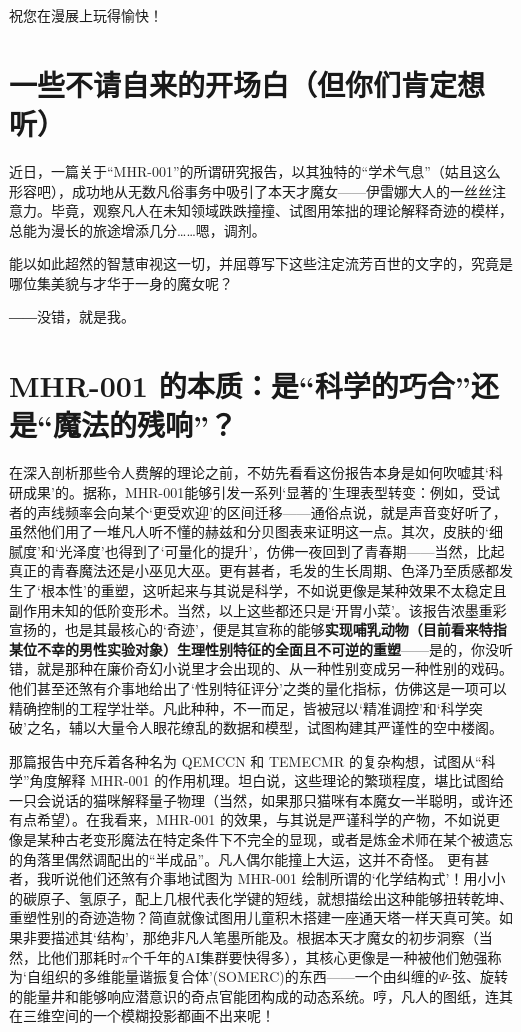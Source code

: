 \documentclass[lang=cn]{elegantpaper}
\begin{document}
祝您在漫展上玩得愉快！

\section*{一些不请自来的开场白（但你们肯定想听）}
近日，一篇关于“MHR-001”的所谓研究报告，以其独特的“学术气息”（姑且这么形容吧），成功地从无数凡俗事务中吸引了本天才魔女——伊雷娜大人的一丝丝注意力。毕竟，观察凡人在未知领域跌跌撞撞、试图用笨拙的理论解释奇迹的模样，总能为漫长的旅途增添几分……嗯，调剂。

能以如此超然的智慧审视这一切，并屈尊写下这些注定流芳百世的文字的，究竟是哪位集美貌与才华于一身的魔女呢？
\begin{flushright}
    ――没错，就是我。
\end{flushright}

\section*{MHR-001 的本质：是“科学的巧合”还是“魔法的残响”？}
在深入剖析那些令人费解的理论之前，不妨先看看这份报告本身是如何吹嘘其‘科研成果’的。据称，MHR-001能够引发一系列‘显著的’生理表型转变：例如，受试者的声线频率会向某个‘更受欢迎’的区间迁移——通俗点说，就是声音变好听了，虽然他们用了一堆凡人听不懂的赫兹和分贝图表来证明这一点。其次，皮肤的‘细腻度’和‘光泽度’也得到了‘可量化的提升’，仿佛一夜回到了青春期——当然，比起真正的青春魔法还是小巫见大巫。更有甚者，毛发的生长周期、色泽乃至质感都发生了‘根本性’的重塑，这听起来与其说是科学，不如说更像是某种效果不太稳定且副作用未知的低阶变形术。当然，以上这些都还只是‘开胃小菜’。该报告浓墨重彩宣扬的，也是其最核心的‘奇迹’，便是其宣称的能够\textbf{实现哺乳动物（目前看来特指某位不幸的男性实验对象）生理性别特征的全面且不可逆的重塑}——是的，你没听错，就是那种在廉价奇幻小说里才会出现的、从一种性别变成另一种性别的戏码。他们甚至还煞有介事地给出了‘性别特征评分’之类的量化指标，仿佛这是一项可以精确控制的工程学壮举。凡此种种，不一而足，皆被冠以‘精准调控’和‘科学突破’之名，辅以大量令人眼花缭乱的数据和模型，试图构建其严谨性的空中楼阁。

那篇报告中充斥着各种名为 QEMCCN 和 TEMECMR 的复杂构想，试图从“科学”角度解释 MHR-001 的作用机理。坦白说，这些理论的繁琐程度，堪比试图给一只会说话的猫咪解释量子物理（当然，如果那只猫咪有本魔女一半聪明，或许还有点希望）。在我看来，MHR-001 的效果，与其说是严谨科学的产物，不如说更像是某种古老变形魔法在特定条件下不完全的显现，或者是炼金术师在某个被遗忘的角落里偶然调配出的“半成品”。凡人偶尔能撞上大运，这并不奇怪。
更有甚者，我听说他们还煞有介事地试图为 MHR-001 绘制所谓的‘化学结构式’！用小小的碳原子、氢原子，配上几根代表化学键的短线，就想描绘出这种能够扭转乾坤、重塑性别的奇迹造物？简直就像试图用儿童积木搭建一座通天塔一样天真可笑。如果非要描述其‘结构’，那绝非凡人笔墨所能及。根据本天才魔女的初步洞察（当然，比他们那耗时$\pi$个千年的AI集群要快得多），其核心更像是一种被他们勉强称为‘自组织的多维能量谐振复合体’(SOMERC)的东西——一个由纠缠的$\Psi$-弦、旋转的能量井和能够响应潜意识的奇点官能团构成的动态系统。哼，凡人的图纸，连其在三维空间的一个模糊投影都画不出来呢！
\end{document}
